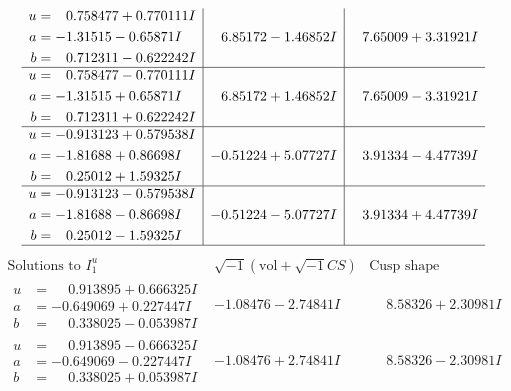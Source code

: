 \documentclass[1p]{elsarticle_modified}
\theoremstyle{definition}
\newcommand{\I}{\sqrt{-1}}
\begin{document}
$$\begin{array}{c|c|c}
\begin{aligned}
u &= \phantom{-}0.758477 + 0.770111 I \\
a &= -1.31515 - 0.65871 I \\
b &= \phantom{-}0.712311 - 0.622242 I\end{aligned}
 & \phantom{-}6.85172 - 1.46852 I & \phantom{-}7.65009 + 3.31921 I \\ \hline\begin{aligned}
u &= \phantom{-}0.758477 - 0.770111 I \\
a &= -1.31515 + 0.65871 I \\
b &= \phantom{-}0.712311 + 0.622242 I\end{aligned}
 & \phantom{-}6.85172 + 1.46852 I & \phantom{-}7.65009 - 3.31921 I \\ \hline\begin{aligned}
u &= -0.913123 + 0.579538 I \\
a &= -1.81688 + 0.86698 I \\
b &= \phantom{-}0.25012 + 1.59325 I\end{aligned}
 & -0.51224 + 5.07727 I & \phantom{-}3.91334 - 4.47739 I \\ \hline\begin{aligned}
u &= -0.913123 - 0.579538 I \\
a &= -1.81688 - 0.86698 I \\
b &= \phantom{-}0.25012 - 1.59325 I\end{aligned}
 & -0.51224 - 5.07727 I & \phantom{-}3.91334 + 4.47739 I\\
 \hline 
 \end{array}$$\newpage$$\begin{array}{c|c|c}  
\text{Solutions to }I^u_{1}& \I (\text{vol} + \sqrt{-1}CS) & \text{Cusp shape}\\
 \hline 
\begin{aligned}
u &= \phantom{-}0.913895 + 0.666325 I \\
a &= -0.649069 + 0.227447 I \\
b &= \phantom{-}0.338025 - 0.053987 I\end{aligned}
 & -1.08476 - 2.74841 I & \phantom{-}8.58326 + 2.30981 I \\ \hline\begin{aligned}
u &= \phantom{-}0.913895 - 0.666325 I \\
a &= -0.649069 - 0.227447 I \\
b &= \phantom{-}0.338025 + 0.053987 I\end{aligned}
 & -1.08476 + 2.74841 I & \phantom{-}8.58326 - 2.30981 I \\ \hline\begin{aligned}

\end{aligned}
\end{array}$$
\end{document}
